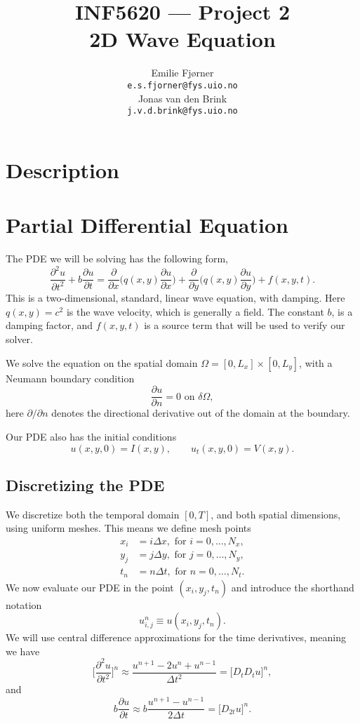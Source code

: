 \documentclass[a4paper, 11pt, notitlepage, english]{article}
\author{Emilie Fjørner \\[-0.4cm] \texttt{e.s.fjorner@fys.uio.no} \\[0.2cm] Jonas van den Brink \\[-0.4cm] \texttt{j.v.d.brink@fys.uio.no}}
\title{INF5620 --- Project 2 \\ 2D Wave Equation}
\newcommand{\p}{\partial}
\begin{document}
\maketitle

\vspace{1cm}

\section*{Description}

\clearpage

\section*{Partial Differential Equation}

The PDE we will be solving has the following form,
$$\frac{\p^2 u}{\p t^2} + b\frac{\p u}{\p t} = \frac{\p}{\p x}\bigg(q(x,y) \frac{\p u}{\p x}\bigg) + \frac{\p}{\p y}\bigg(q(x,y)\frac{\p u}{\p y} \bigg) + f(x,y,t).$$
This is a two-dimensional, standard, linear wave equation, with damping. Here $q(x,y) = c^2$ is the wave velocity, which is generally a field. The constant $b$, is a damping factor, and $f(x,y,t)$ is a source term that will be used to verify our solver.

We solve the equation on the spatial domain $\Omega = [0,L_x] \times [0,L_y]$, with a Neumann boundary condition
$$\frac{\p u}{\p n} = 0 \mbox{ on } \delta\Omega,$$
here $\p/\p n$ denotes the directional derivative out of the domain at the boundary.

Our PDE also has the initial conditions
$$u(x,y,0) = I(x,y), \qquad u_t(x,y,0) = V(x,y).$$

\subsection*{Discretizing the PDE}
We discretize both the temporal domain $[0,T]$, and both spatial dimensions, using uniform meshes. This means we define mesh points
\begin{align*}
x_i &= i\Delta x, \mbox{ for } i=0,\ldots,N_x, \\
y_j &= j\Delta y, \mbox{ for } j=0,\ldots,N_y, \\
t_n &= n\Delta t, \mbox{ for } n=0,\ldots,N_t.
\end{align*}
We now evaluate our PDE in the point $(x_i, y_j, t_n)$ and introduce the shorthand notation
$$u_{i,j}^n \equiv u(x_i, y_j, t_n).$$
We will use central difference approximations for the time derivatives, meaning we have
$$\bigg[\frac{\p^2 u}{\p t^2}\bigg]^n \approx \frac{u^{n+1} - 2u^n + u^{n-1}}{\Delta t^2} = \bigg[D_tD_t u\bigg]^n,$$
and
$$b\frac{\p u}{\p t} \approx b \frac{u^{n+1}-u^{n-1}}{2\Delta t} = \bigg[D_{2t}u\bigg]^n.$$
\end{document}
